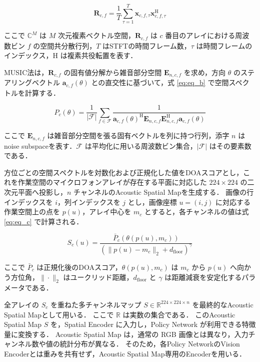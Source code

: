 \documentclass{article}
\begin{document}
	\begin{equation}
	\label{eq:eq_a}
	\mathbf{R}_{c,f}=\frac{1}{T}\sum_{\tau=1}^{T}
	\mathbf{x}_{c,f,\tau}\mathbf{x}_{c,f,\tau}^{\mathrm{H}}
	\end{equation}
	
	ここで $\mathbb{C}^{M}$ は $M$ 次元複素ベクトル空間，$\mathbf{R}_{c,f}$ は $c$ 番目のアレイにおける周波数ビン $f$ の空間共分散行列，$T$ はSTFTの時間フレーム数，$\tau$ は時間フレームのインデックス，$\mathrm{H}$ は複素共役転置を表す．

	MUSIC法は，$\mathbf{R}_{c,f}$ の固有値分解から雑音部分空間 $\mathbf{E}_{n,c,f}$ を求め，方向 $\theta$ のステアリングベクトル $\mathbf{a}_{c,f}(\theta)$ との直交性に基づいて，式 \ref{eq:eq_b} で空間スペクトルを計算する．

	\begin{equation}
	\label{eq:eq_b}
	P_c(\theta)=\frac{1}{|\mathcal{F}|}\sum_{f\in\mathcal{F}}
	\frac{1}{\mathbf{a}_{c,f}(\theta)^{\mathrm{H}}
	\mathbf{E}_{n,c,f}\mathbf{E}_{n,c,f}^{\mathrm{H}}
	\mathbf{a}_{c,f}(\theta)}
	\end{equation}
	
	ここで $\mathbf{E}_{n,c,f}$ は雑音部分空間を張る固有ベクトルを列に持つ行列，添字 $n$ はnoise subspaceを表す．$\mathcal{F}$ は平均化に用いる周波数ビン集合，$|\mathcal{F}|$ はその要素数である．

	方位ごとの空間スペクトルを対数化および正規化した値をDOAスコアとし，これを作業空間のマイクロフォンアレイが存在する平面に対応した $224\times224$ の二次元平面へ投影し，$n$ チャンネルのAcoustic Spatial Mapを生成する．
	画像の行インデックスを $i$，列インデックスを $j$ とし，画像座標 $u=(i,j)$ に対応する作業空間上の点を $p(u)$，アレイ中心を $m_c$ とすると，各チャンネルの値は式 \ref{eq:eq_c} で計算される．

	\begin{equation}
	\label{eq:eq_c}
	S_c(u)=\frac{\bar{P}_c(\theta(p(u),m_c))}
	{\left(\|p(u)-m_c\|_2+d_{\mathrm{floor}}\right)^\gamma}
	\end{equation}
	
	ここで $\bar{P}_c$ は正規化後のDOAスコア，$\theta(p(u),m_c)$ は $m_c$ から $p(u)$ へ向かう方位角，$\|\cdot\|_2$ はユークリッド距離，$d_{\mathrm{floor}}$ と $\gamma$ は距離減衰を安定化するパラメータである．

	全アレイの $S_c$ を重ねた多チャンネルマップ $S\in\mathbb{R}^{224\times224\times n}$ を最終的なAcoustic Spatial Mapとして用いる．
	ここで $\mathbb{R}$ は実数の集合である．
	このAcoustic Spatial Map $S$ を，Spatial Encoder に入力し，Policy Network が利用できる特徴量に変換する．
	Acoustic Spatial Map は，通常の RGB 画像とは異なり，入力チャンネル数や値の統計分布が異なる．
	そのため，各Policy NetworkのVision Encoderとは重みを共有せず，Acoustic Spatial Map専用のEncoderを用いる．
\end{document}
